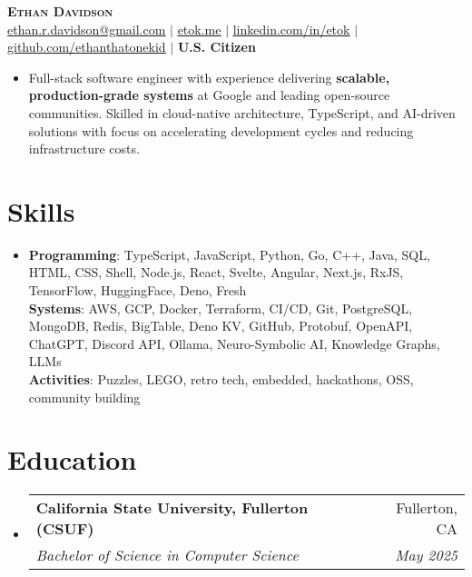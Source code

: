 \documentclass[letterpaper,11pt]{article}
\makeatletter
\newcommand{\resumeItem}[1]{
  \item\small{
    {#1 \vspace{-2pt}}
  }
}
\newcommand{\resumeSubheading}[4]{
  \vspace{-2pt}\item
    \begin{tabular*}{0.97\textwidth}[t]{l@{\extracolsep{\fill}}r}
      \textbf{#1} & #2 \\
      \textit{\small#3} & \textit{\small #4} \\
    \end{tabular*}\vspace{-2pt}
}
\newcommand{\resumeSubHeadingListStart}{\begin{itemize}[leftmargin=0.15in, label={}]}
\newcommand{\resumeSubHeadingListEnd}{\end{itemize}}
\makeatother
\begin{document}
\begin{center}
  \textbf{\Huge \scshape Ethan Davidson} \\ \vspace{1pt}
  \small \href{mailto:ethan.r.davidson@gmail.com}{\underline{ethan.r.davidson@gmail.com}} $|$ 
  \href{https://etok.me/}{\underline{etok.me}} $|$
  \href{https://linkedin.com/in/etok}{\underline{linkedin.com/in/etok}} $|$
  \href{https://github.com/ethanthatonekid}{\underline{github.com/ethanthatonekid}} $|$
  \textbf{U.S. Citizen}
\end{center}

\begin{itemize}[leftmargin=0.15in, label={}]
  \resumeItem{Full-stack software engineer with experience delivering \textbf{scalable, production-grade systems} at Google and leading open-source communities. Skilled in cloud-native architecture, TypeScript, and AI-driven solutions with focus on accelerating development cycles and reducing infrastructure costs.}
\end{itemize}

\section{Skills}
\begin{itemize}[leftmargin=0.15in, label={}]
    \resumeItem{
      \textbf{Programming}{: TypeScript, JavaScript, Python, Go, C++, Java, SQL, HTML, CSS, Shell, Node.js, React, Svelte, Angular, Next.js, RxJS, TensorFlow, HuggingFace, Deno, Fresh} \\
      \textbf{Systems}{: AWS, GCP, Docker, Terraform, CI/CD, Git, PostgreSQL, MongoDB, Redis, BigTable, Deno KV, GitHub, Protobuf, OpenAPI, ChatGPT, Discord API, Ollama, Neuro-Symbolic AI, Knowledge Graphs, LLMs} \\
      \textbf{Activities}{: Puzzles, LEGO, retro tech, embedded, hackathons, OSS, community building}
    }
 \end{itemize}

\section{Education}
\resumeSubHeadingListStart
  \resumeSubheading
    {California State University, Fullerton (CSUF)}{Fullerton, CA}
    {Bachelor of Science in Computer Science}{May 2025}
\resumeSubHeadingListEnd
\end{document}
